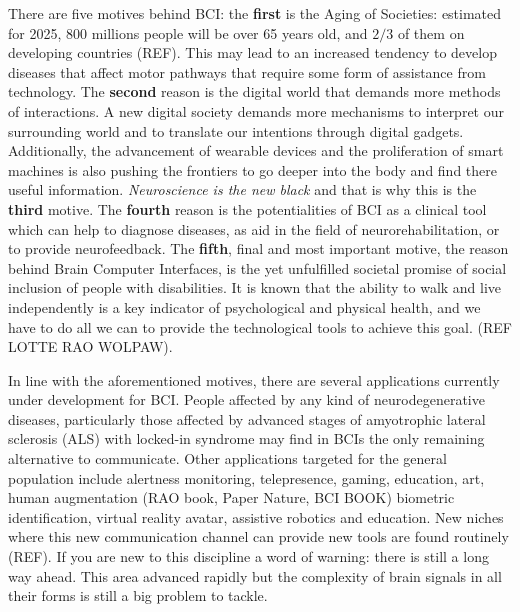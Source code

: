 There are five motives behind BCI: the \textbf{first} is the Aging of Societies: estimated for 2025, 800 millions people will be over 65 years old, and $2/3$ of them on developing countries (REF).  This may lead to an increased tendency to develop diseases that affect motor pathways that  require some form of assistance from technology.  The \textbf{second} reason is the digital world that demands more methods of interactions. A new digital society demands more mechanisms to interpret our surrounding world and to translate our intentions through digital gadgets.  Additionally, the advancement of wearable devices and the proliferation of smart machines is also pushing the frontiers to go deeper into the body and find there useful information.  \textit{Neuroscience is the new black} and that is why this is the \textbf{third} motive.  The \textbf{fourth} reason is the potentialities of BCI as a clinical tool which can help to diagnose diseases, as aid in the field of neurorehabilitation,  or to provide neurofeedback.  The \textbf{fifth}, final and most important motive, the reason behind Brain Computer Interfaces, is the yet unfulfilled societal promise of social inclusion of people with disabilities.  It is known that the ability to walk and live independently is a key indicator of psychological and physical health, and we have to do all we can to provide the technological tools to achieve this goal.  (REF LOTTE RAO WOLPAW). 

In line with the aforementioned motives, there are several applications currently under development for BCI.  People affected by any kind of neurodegenerative diseases, particularly those affected by advanced stages of amyotrophic lateral sclerosis (ALS) with locked-in syndrome may find in BCIs the only remaining alternative to communicate. Other applications targeted for the general population include alertness monitoring, telepresence, gaming, education, art, human augmentation (RAO book, Paper Nature, BCI BOOK) biometric identification, virtual reality avatar, assistive robotics and education.  New niches where this new communication channel can provide new tools are found routinely (REF). If you are new to this discipline a word of warning: there is still a long way ahead.  This area advanced rapidly but the complexity of brain signals in all their forms is still a big problem to tackle.  



